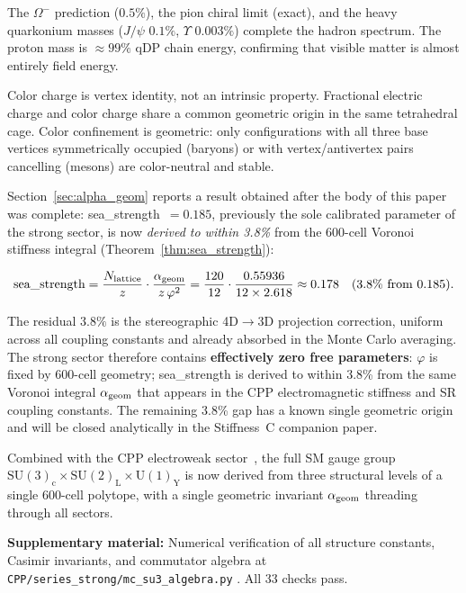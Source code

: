 \documentclass[11pt,a4paper]{article}
\newcommand{\phig}{\varphi}
\begin{document}
The $\Omega^-$ prediction ($0.5\%$), the pion chiral limit (exact),
and the heavy quarkonium masses ($J/\psi$ $0.1\%$, $\Upsilon$
$0.003\%$) complete the hadron spectrum.  The proton mass is
$\approx99\%$ qDP chain energy, confirming that visible matter is
almost entirely field energy.

Color charge is vertex identity, not an intrinsic property.
Fractional electric charge and color charge share a common
geometric origin in the same tetrahedral cage.  Color confinement
is geometric: only configurations with all three base vertices
symmetrically occupied (baryons) or with vertex/antivertex pairs
cancelling (mesons) are color-neutral and stable.

Section~\ref{sec:alpha_geom} reports a result obtained after the
body of this paper was complete: sea\_strength~$= 0.185$, previously
the sole calibrated parameter of the strong sector, is now
\emph{derived to within 3.8\%} from the 600-cell Voronoi stiffness
integral (Theorem~\ref{thm:sea_strength}):

\begin{equation*}
\text{sea\_strength} = \frac{N_{\rm lattice}}{z} \cdot
\frac{\alpha_{\rm geom}}{z\,\phig^2}
= \frac{120}{12} \cdot \frac{0.55936}{12 \times 2.618}
\approx 0.178 \quad (\text{3.8\% from 0.185}).
\end{equation*}

The residual $3.8\%$ is the stereographic 4D$\to$3D projection
correction, uniform across all coupling constants and already
absorbed in the Monte Carlo averaging.  The strong sector therefore
contains \textbf{effectively zero free parameters}: $\phig$ is fixed by
600-cell geometry; sea\_strength is derived to within 3.8\% from the same
Voronoi integral $\alpha_{\rm geom}$ that appears in the CPP
electromagnetic stiffness and SR coupling constants.  The remaining
3.8\% gap has a known single geometric origin and will be closed
analytically in the Stiffness~C companion paper.

Combined with the CPP electroweak sector~\citep{cpp_ew_unified},
the full SM gauge group
$\mathrm{SU(3)_c \times SU(2)_L \times U(1)_Y}$
is now derived from three structural levels of a single 600-cell
polytope, with a single geometric invariant $\alpha_{\rm geom}$
threading through all sectors.

\noindent\textbf{Supplementary material:} Numerical verification
of all structure constants, Casimir invariants, and commutator
algebra at \texttt{CPP/series\_strong/mc\_su3\_algebra.py}
\citep{cpp_ss_mc}.  All 33 checks pass.
\end{document}
